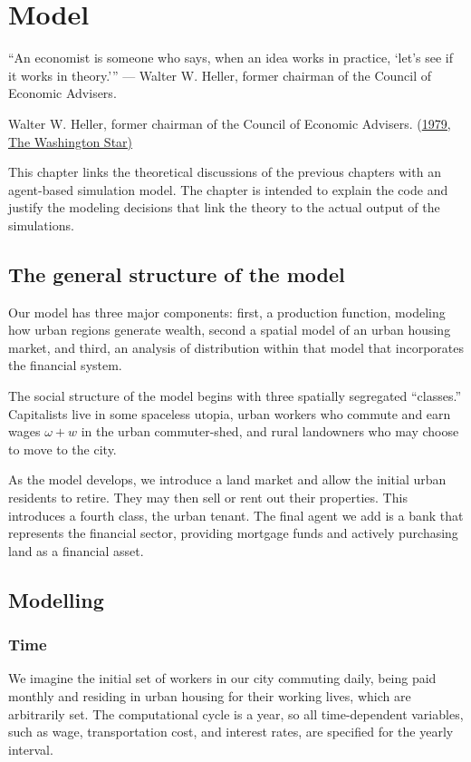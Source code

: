 \chapter{Model} \label{chapter-model}
\epigraph{“An economist is someone who says, when an idea works in practice, ‘let’s see if it works in theory.'”
— Walter W. Heller, former chairman of the Council of Economic Advisers.}{ Walter W. Heller, former chairman of the Council of Economic Advisers. (\href{https://quoteinvestigator.com/2015/08/30/practice/}{1979, The Washington Star)}}

\newcommand{\ee}[1]{\color{red}#1 \color{black}}

This chapter links the theoretical discussions of the previous chapters with an agent-based simulation model. The chapter is intended to explain the code and justify the modeling decisions that link the theory to the actual output of the simulations.



\section{The general structure of the model}
Our model has three major components: first, a production function, modeling how urban regions generate wealth,  second a spatial model of an urban housing market, and third, an analysis of distribution within that model that incorporates the financial system.

The social structure of the model begins with  three spatially segregated ``classes.'' Capitalists live in some spaceless utopia, urban workers who commute and earn wages $\omega + w$ in the urban commuter-shed, and  rural landowners who may choose to move to the city. %

As the model develops, we introduce a land market and allow  the initial urban residents  to retire. They may then  sell or rent out their properties. This introduces a fourth class, the urban tenant. The final agent we add is a bank that represents 
the financial sector, providing mortgage funds and actively purchasing land as a financial asset.



\section{Modelling} 
\subsection{Time}
We imagine the initial set of workers in our city commuting daily, being paid monthly and residing in urban housing for their working lives, which are arbitrarily set. The computational cycle is a year, so all time-dependent variables, such as  wage, transportation cost, and interest rates, are specified for the yearly interval. 



